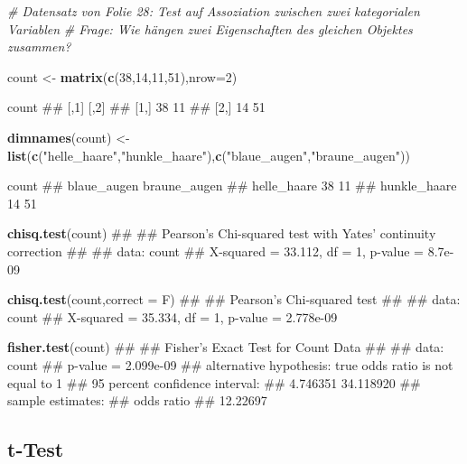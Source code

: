\documentclass[]{book}
\newenvironment{Shaded}{\begin{snugshade}}{\end{snugshade}}
\newcommand{\KeywordTok}[1]{\textcolor[rgb]{0.13,0.29,0.53}{\textbf{#1}}}
\newcommand{\DataTypeTok}[1]{\textcolor[rgb]{0.13,0.29,0.53}{#1}}
\newcommand{\DecValTok}[1]{\textcolor[rgb]{0.00,0.00,0.81}{#1}}
\newcommand{\StringTok}[1]{\textcolor[rgb]{0.31,0.60,0.02}{#1}}
\newcommand{\CommentTok}[1]{\textcolor[rgb]{0.56,0.35,0.01}{\textit{#1}}}
\newcommand{\NormalTok}[1]{#1}
\begin{document}
\begin{Shaded}
\begin{Highlighting}[]

\CommentTok{# Datensatz von Folie 28: Test auf Assoziation zwischen zwei kategorialen Variablen}
\CommentTok{# Frage: Wie hängen zwei Eigenschaften des gleichen Objektes zusammen?}

\NormalTok{count <-}\StringTok{ }\KeywordTok{matrix}\NormalTok{(}\KeywordTok{c}\NormalTok{(}\DecValTok{38}\NormalTok{,}\DecValTok{14}\NormalTok{,}\DecValTok{11}\NormalTok{,}\DecValTok{51}\NormalTok{),}\DataTypeTok{nrow=}\DecValTok{2}\NormalTok{)}

\NormalTok{count}
\NormalTok{##      [,1] [,2]}
\NormalTok{## [1,]   38   11}
\NormalTok{## [2,]   14   51}

\KeywordTok{dimnames}\NormalTok{(count) <-}\StringTok{ }\KeywordTok{list}\NormalTok{(}\KeywordTok{c}\NormalTok{(}\StringTok{"helle_haare"}\NormalTok{,}\StringTok{"hunkle_haare"}\NormalTok{),}\KeywordTok{c}\NormalTok{(}\StringTok{"blaue_augen"}\NormalTok{,}\StringTok{"braune_augen"}\NormalTok{))}

\NormalTok{count}
\NormalTok{##              blaue_augen braune_augen}
\NormalTok{## helle_haare           38           11}
\NormalTok{## hunkle_haare          14           51}

\KeywordTok{chisq.test}\NormalTok{(count)}
\NormalTok{## }
\NormalTok{##  Pearson's Chi-squared test with Yates' continuity correction}
\NormalTok{## }
\NormalTok{## data:  count}
\NormalTok{## X-squared = 33.112, df = 1, p-value = 8.7e-09}

\KeywordTok{chisq.test}\NormalTok{(count,}\DataTypeTok{correct =}\NormalTok{ F)}
\NormalTok{## }
\NormalTok{##  Pearson's Chi-squared test}
\NormalTok{## }
\NormalTok{## data:  count}
\NormalTok{## X-squared = 35.334, df = 1, p-value = 2.778e-09}

\KeywordTok{fisher.test}\NormalTok{(count)}
\NormalTok{## }
\NormalTok{##  Fisher's Exact Test for Count Data}
\NormalTok{## }
\NormalTok{## data:  count}
\NormalTok{## p-value = 2.099e-09}
\NormalTok{## alternative hypothesis: true odds ratio is not equal to 1}
\NormalTok{## 95 percent confidence interval:}
\NormalTok{##   4.746351 34.118920}
\NormalTok{## sample estimates:}
\NormalTok{## odds ratio }
\NormalTok{##   12.22697}
\end{Highlighting}
\end{Shaded}

\subsection{t-Test}\label{t-test}
\end{document}
